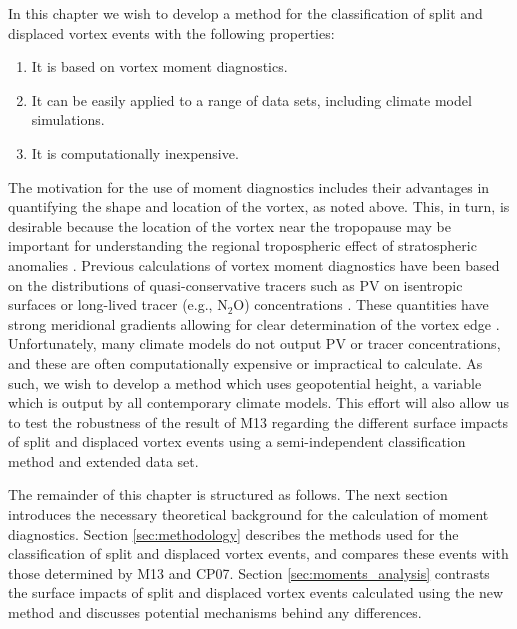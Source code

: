 In this chapter we wish to develop a method for the classification of split and
displaced vortex events with the following properties:
\begin{enumerate}
\item It is based on vortex moment diagnostics.
\item It can be easily applied to a range of data sets, including climate model
  simulations.
\item It is computationally inexpensive. 
\end{enumerate}
The motivation for the use of moment diagnostics includes their advantages in
quantifying the shape and location of the vortex, as noted above. This, in turn,
is desirable because the location of the vortex near the tropopause may be
important for understanding the regional tropospheric effect of stratospheric
anomalies \citep[e.g.,][Section \ref{sec:mechanisms}]{Ambaum2002}. Previous
calculations of vortex moment diagnostics have been based on the distributions
of quasi-conservative tracers such as PV on isentropic surfaces
\citep{Mitchell2011} or long-lived tracer (e.g., N$_{2}$O) concentrations
\citep{Waugh1997}. These quantities have strong meridional gradients allowing
for clear determination of the vortex edge \citep{Nash1996}. Unfortunately, many
climate models do not output PV or tracer concentrations, and these are often
computationally expensive or impractical to calculate. As such, we wish to
develop a method which uses geopotential height, a variable which is output by
all contemporary climate models. This effort will also allow us to test the
robustness of the result of M13 regarding the different surface impacts of split
and displaced vortex events using a semi-independent classification method and
extended data set.

The remainder of this chapter is structured as follows. The next section
introduces the necessary theoretical background for the calculation of moment
diagnostics. Section \ref{sec:methodology} describes the methods used for the
classification of split and displaced vortex events, and compares these events
with those determined by M13 and CP07. Section \ref{sec:moments_analysis}
contrasts the surface impacts of split and displaced vortex events calculated
using the new method and discusses potential mechanisms behind any differences. 


